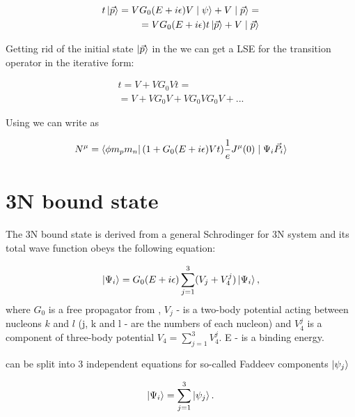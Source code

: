     \begin{eqnarray}
        t \ket{\vec{p}} = V G_0(E + i\epsilon)V \mid \psi \rangle +  V \mid \vec{p} \rangle = \nonumber\\
        = V G_0(E + i\epsilon) t \ket{\vec{p}} +  V \mid \vec{p} \rangle
        \label{top2}
    \end{eqnarray}

    Getting rid of the initial state $\ket{\vec{p}}$ in the  we can get a LSE
    for the transition operator in the iterative form:

    \begin{eqnarray}
        t = V + V G_0V t = \nonumber\\
        = V + V G_0 V + V G_0 V G_0V + ...
    \end{eqnarray}

    Using  we can write  as
    
    \begin{equation}
        N^\mu = \bra{\phi m_p m_n} (1 + G_0(E + i\epsilon)V t) \frac{1}{e}J^\mu(0) \mid \Psi_i \vec{P_i} \rangle
        \label{main_top}
    \end{equation}

    
\section{3N bound state}

    The 3N bound state is derived from a general Schrodinger for 3N system
    and its total wave function obeys the following equation:

    \begin{equation}
        \ket{\Psi_i} = G_0(E+i\epsilon)\sum_{j=1}^3 (V_j + V_4^j) \ket{\Psi_i},
        \label{psi3_total}
    \end{equation}
    where $G_0$ is a free propagator from , $V_j$ - is a two-body potential
    acting between nucleons $k$ and $l$ (j, k and l - are the numbers of each nucleon)
    and $V_4^j$ is a component of three-body potential $V_4 = \sum_{j=1}^3 V_4^j$.
    E - is a binding energy.

     can be split into 3 independent equations for
    so-called Faddeev components $\ket{\psi_j}$

    \begin{equation}
        \ket{\Psi_i} = \sum_{j=1}^3 \ket{\psi_j}.
        \label{faddeev_comps}
    \end{equation}

